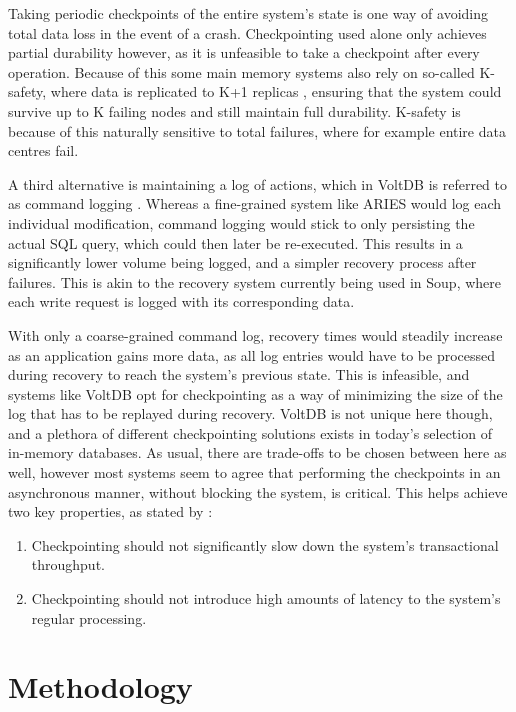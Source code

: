 \documentclass[b5paper]{report}
\begin{document}
Taking periodic checkpoints of the entire system's state is one way of avoiding
total data loss in the event of a crash. Checkpointing used alone only achieves
partial durability however, as it is unfeasible to take a checkpoint after every
operation. Because of this some main memory systems also rely on so-called
K-safety, where data is replicated to K+1 replicas \cite{early-voltdb},
ensuring that the system could survive up to K failing nodes and still maintain
full durability. K-safety is because of this naturally sensitive to total
failures, where for example entire data centres fail.

A third alternative is maintaining a log of actions, which in VoltDB is referred
to as command logging \cite{voltdb-recovery}. Whereas a fine-grained system like
ARIES would log each individual modification, command logging would stick to
only persisting the actual SQL query, which could then later be re-executed.
This results in a significantly lower volume being logged, and a simpler
recovery process after failures. This is akin to the recovery system currently
being used in Soup, where each write request is logged with its corresponding
data.

With only a coarse-grained command log, recovery times would steadily increase
as an application gains more data, as all log entries would have to be processed
during recovery to reach the system's previous state. This is infeasible, and
systems like VoltDB opt for checkpointing as a way of minimizing the size of the
log that has to be replayed during recovery. VoltDB is not unique here though, and
a plethora of different checkpointing solutions exists in today's selection of
in-memory databases. As usual, there are trade-offs to be chosen between here
as well, however most systems seem to agree that performing the checkpoints in
an asynchronous manner, without blocking the system, is critical. This helps
achieve two key properties, as stated by \cite{memory-checkpoint}:

\begin{enumerate}
  \item Checkpointing should not significantly slow down the system's
    transactional throughput.
  \item Checkpointing should not introduce high amounts of latency to the
    system's regular processing.
\end{enumerate}

\chapter{Methodology}
\end{document}
